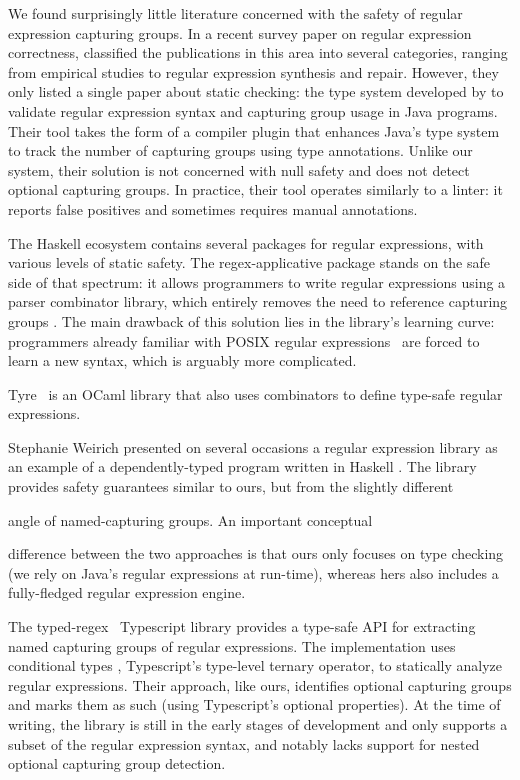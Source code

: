 We found surprisingly little literature concerned with the safety of regular expression capturing groups.
In a recent survey paper on regular expression correctness, \citet{li2021ensuring} classified the publications in this area into several categories, ranging from empirical studies to regular expression synthesis and repair.
However, they only listed a single paper about static checking: the type system developed by \citet{spishak2012type} to validate regular expression syntax and capturing group usage in Java programs.
Their tool takes the form of a compiler plugin that enhances Java's type system to track the number of capturing groups using type annotations.
Unlike our system, their solution is not concerned with null safety and does not detect optional capturing groups.
In practice, their tool operates similarly to a linter: it reports false positives and sometimes requires manual annotations.

The Haskell ecosystem contains several packages for regular expressions, with various levels of static safety.
The regex-applicative package stands on the safe side of that spectrum: it allows programmers to write regular expressions using a parser combinator library, which entirely removes the need to reference capturing groups \citep{cheplyaka2011regex}.
The main drawback of this solution lies in the library's learning curve: programmers already familiar with POSIX regular expressions~\citep{ieee2018the} are forced to learn a new syntax, which is arguably more complicated.
\begin{diff}
Tyre~\citep{radanne2020tyre} is an OCaml library that also uses combinators to define type-safe regular expressions.
\end{diff}

Stephanie Weirich presented on several occasions a regular expression library as an example of a dependently-typed program written in Haskell \citep{weirich2014examples}.
The library provides safety guarantees similar to ours, but from the slightly different \begin{diff}angle of named-capturing groups.
An important conceptual\end{diff} difference between the two approaches is that ours only focuses on type checking (we rely on Java's regular expressions at run-time), whereas hers also includes a fully-fledged regular expression engine.

The typed-regex~\citep{akshay2021typed} Typescript library provides a type-safe API for extracting named capturing groups of regular expressions.
The implementation uses conditional types \citep{microsoft2020typescript}, Typescript's type-level ternary operator, to statically analyze regular expressions.
Their approach, like ours, identifies optional capturing groups and marks them as such (using Typescript's optional properties).
At the time of writing, the library is still in the early stages of development and only supports a subset of the regular expression syntax, and notably lacks support for nested optional capturing group detection.

